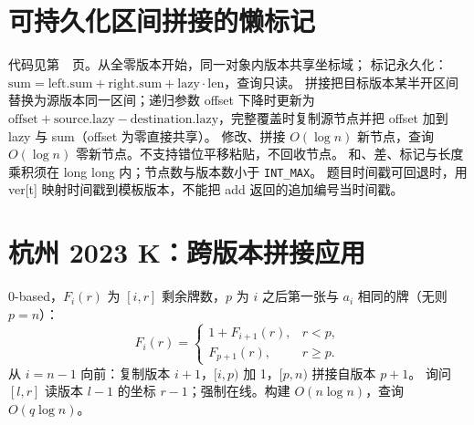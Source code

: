 \section{可持久化区间拼接的懒标记}\label{knowledge-persistent-concat}
代码见第~\pageref{compact-PersistentRange}~页。从全零版本开始，同一对象内版本共享坐标域；
标记永久化：$\mathrm{sum}=\mathrm{left.sum}+\mathrm{right.sum}+\mathrm{lazy}\cdot\mathrm{len}$，查询只读。
拼接把目标版本某半开区间替换为源版本同一区间；递归参数 offset 下降时更新为
$\mathrm{offset}+\mathrm{source.lazy}-\mathrm{destination.lazy}$，完整覆盖时复制源节点并把 offset 加到 lazy 与 sum（offset 为零直接共享）。
修改、拼接 $O(\log n)$ 新节点，查询 $O(\log n)$ 零新节点。不支持错位平移粘贴，不回收节点。
和、差、标记与长度乘积须在 long long 内；节点数与版本数小于 \texttt{INT\_MAX}。
题目时间戳可回退时，用 ver[t] 映射时间戳到模板版本，不能把 add 返回的追加编号当时间戳。

\section{杭州 2023 K：跨版本拼接应用}\label{knowledge-hangzhou-k}
0-based，$F_i(r)$ 为 $[i,r]$ 剩余牌数，$p$ 为 $i$ 之后第一张与 $a_i$ 相同的牌（无则 $p=n$）：
\[
 F_i(r)=\begin{cases}
 1+F_{i+1}(r),&r<p,\\
 F_{p+1}(r),&r\ge p.
 \end{cases}
\]
从 $i=n-1$ 向前：复制版本 $i+1$，$[i,p)$ 加 1，$[p,n)$ 拼接自版本 $p+1$。
询问 $[l,r]$ 读版本 $l-1$ 的坐标 $r-1$；强制在线。构建 $O(n\log n)$，查询 $O(q\log n)$。

